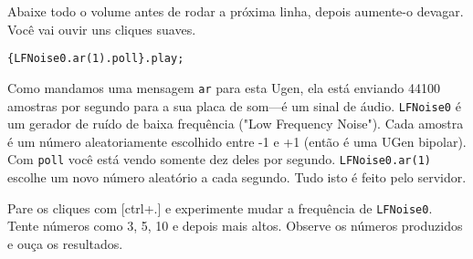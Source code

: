Abaixe todo o volume antes de rodar a próxima linha, depois aumente-o devagar. Você vai ouvir uns cliques suaves.

\begin{lstlisting}[style=SuperCollider-IDE, basicstyle=\scttfamily\footnotesize]
{LFNoise0.ar(1).poll}.play;
\end{lstlisting}

Como mandamos uma mensagem \texttt{ar} para esta Ugen, ela está enviando 44100 amostras por segundo para a sua placa de som---é um sinal de áudio. \texttt{LFNoise0} é um gerador de ruído de baixa frequência ("Low Frequency Noise"). Cada amostra é um número aleatoriamente escolhido entre -1 e +1 (então é uma UGen bipolar). Com \texttt{poll} você está vendo somente dez deles por segundo. \texttt{LFNoise0.ar(1)} escolhe um novo número aleatório a cada segundo. Tudo isto é feito pelo servidor.

Pare os cliques com [ctrl+.] e experimente mudar a frequência de \texttt{LFNoise0}. Tente números como 3, 5, 10 e depois mais altos. Observe os números produzidos e ouça os resultados.

